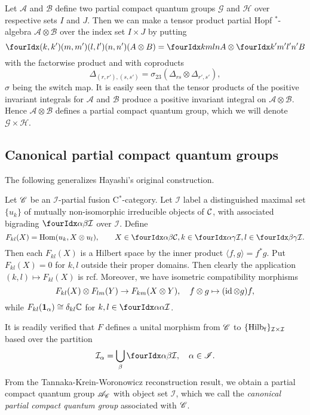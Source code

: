\begin{Exa} Let $\mathscr{A}$ and $\mathscr{B}$ define two partial compact quantum groups $\mathscr{G}$ and $\mathscr{H}$ over respective sets $I$ and $J$. Then we can make a tensor product partial Hopf $^*$-algebra $\mathscr{A}\otimes \mathscr{B}$ over the index set $I\times J$ by putting \[\Gr{(A\otimes B)}{(k,k')}{(l,l')}{(m,m')}{(n,n')} = \Gr{A}{k}{l}{m}{n}\otimes \Gr{B}{k'}{l'}{m'}{n'}\] with the factorwise product and with coproducts \[\Delta_{(r,r'),(s,s')} = \sigma_{23}(\Delta_{rs}\otimes \Delta_{r',s'}),\] $\sigma$ being the switch map. It is easily seen that the tensor products of the positive invariant integrals for $\mathscr{A}$ and $\mathscr{B}$ produce a positive invariant integral on $\mathscr{A}\otimes \mathscr{B}$. Hence $\mathscr{A}\otimes \mathscr{B}$ defines a partial compact quantum group, which we will denote $\mathscr{G}\times \mathscr{H}$.
\end{Exa}

\subsection{Canonical partial compact quantum groups}

The following generalizes Hayashi's original construction.

\begin{Exa} 
Let $\mathscr{C}$ be an $\mathscr{I}$-partial fusion C$^*$-category. Let $\mathcal{I}$ label a distinguished maximal set $\{u_k\}$ of mutually non-isomorphic irreducible objects of $\mathcal{C}$, with associated bigrading $\Gru{\mathcal{I}}{\alpha}{\beta}$ over $\mathscr{I}$. Define \[F_{kl}(X)  = \Hom(u_k,  X\otimes u_l),\qquad X\in \Gru{\CatC}{\alpha}{\beta}, k\in \Gru{\mathcal{I}}{\alpha}{\gamma},l\in \Gru{\mathcal{I}}{\beta}{\gamma}.\] Then each $F_{kl}(X)$ is a Hilbert space by the inner product $\langle f,g\rangle = f^*g$. Put $F_{kl}(X) = 0$ for $k,l$ outside their proper domains. Then clearly the application $(k,l)\mapsto F_{kl}(X)$ is rcf. Moreover, we have isometric compatibility morphisms \[F_{kl}(X)\otimes F_{lm}(Y)\rightarrow F_{km}(X\otimes Y),\quad f\otimes g \mapsto (\operatorname{id}\otimes g)f,\] while $F_{kl}(\mathbf{1}_{\alpha}) \cong \delta_{kl} \mathbb{C}$ for $k,l\in \Gru{\mathcal{I}}{\alpha}{\alpha}$. 

It is readily verified that $F$ defines a unital morphism from $\mathscr{C}$ to $\{\mathrm{Hilb}_{\operatorname{\mathrm{f}}}\}_{\mathcal{I}\times \mathcal{I}}$ based over the partition \[\mathcal{I}_{\alpha} = \bigcup_{\beta} \Gru{\mathcal{I}}{\alpha}{\beta},\quad\alpha\in \mathscr{I}.\] From the Tannaka-Krein-Woronowicz reconstruction result, we obtain a partial compact quantum group $\mathscr{A}_{\mathscr{C}}$ with object set $\mathcal{I}$, which we call the \emph{canonical partial compact quantum group} associated with $\mathscr{C}$. 
\end{Exa} 

